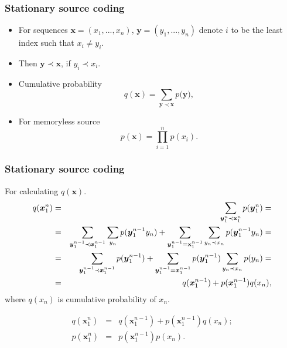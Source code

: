 \documentclass[14pt]{beamer}
\renewcommand{\vec}[1]{\ensuremath{\boldsymbol{#1}}}
\begin{document}
\begin{frame}
\frametitle{Stationary source coding}
\begin{itemize}    

    \item For sequences $\vec x = (x_1 ,...,x_n )$, $\vec y = (y_1 ,...,y_n )$ denote $i$ to be the least index such that $x_i \ne y_i $.
    
    \item Then $\vec y \prec \vec x$, if $y_i \prec x_i$.
    
    \item Cumulative probability
    \begin{equation}
    \label{eq11} q(\vec x) = \sum\limits_{\vec y \prec \vec x}
    {p(\vec y} ),
    \end{equation}
    
    \item For memoryless source
    \[
    p(\vec x) = \prod\limits_{i = 1}^n {p(x_i )} .
    \]
    
    
\end{itemize}
\end{frame}


 \begin{frame}
\frametitle{Stationary source coding}
\begin{itemize}    
\footnotesize {

    \item For calculating $q(\vec x)$.
    \begin{eqnarray*}
     q(\vec x_1^n ) &=& \sum\limits_{\vec y_1^n \prec {\rm {\bf x}}_1^n }
    {p(\vec y_1^n )}=\\
    &=& \sum\limits_{\vec y_1^{n - 1} \prec \vec x_1^{n - 1} }
    {\sum\limits_{y_n } {p(\vec y_1^{n - 1} y_n )} } + \sum\limits_{\vec
    y_1^{n - 1} = {\rm {\bf x}}_1^{n - 1} } {\sum\limits_{y_n \prec x_n
    } {p(\vec y_1^{n - 1} y_n )}} = \\
    &=& \sum\limits_{\vec y_1^{n - 1} \prec \vec x_1^{n - 1} } {p(\vec
    y_1^{n - 1} )} + \sum\limits_{\vec y_1^{n - 1} =  \vec x_1^{n - 1} }
    {p(\vec y_1^{n - 1} )\sum\limits_{y_n \prec x_n } {p(y_n )} }= \\
    &=&q(\vec x_1^{n - 1} ) + p(\vec x_1^{n - 1} )q(x_n ) ,
    \end{eqnarray*}
    where $q(x_n )$ is cumulative probability of $x_n $.
    
    \item
    \begin{eqnarray}
    \label{eq12}
     q(\vec x_1^n ) &=& q(\vec x_1^{n - 1} ) + p(\vec x_1^{n
    - 1} )q(x_n ); \\
     p(\vec x_1^n ) &=& p(\vec x_1^{n - 1} )p(x_n ).
    \end{eqnarray}
}
\end{itemize}
\end{frame}
\end{document}

